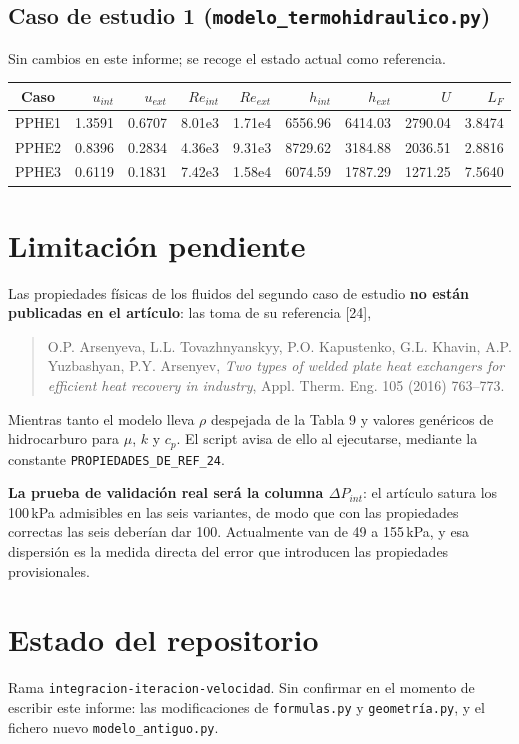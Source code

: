 \documentclass[11pt,a4paper]{article}
\begin{document}
\subsection{Caso de estudio 1 (\texttt{modelo\_termohidraulico.py})}

Sin cambios en este informe; se recoge el estado actual como referencia.

\begin{table}[h]
\centering
\begin{tabular}{crrrrrrrr}
\toprule
Caso & $u_{int}$ & $u_{ext}$ & $Re_{int}$ & $Re_{ext}$ & $h_{int}$ & $h_{ext}$ & $U$ & $L_F$\\
\midrule
PPHE1 & 1.3591 & 0.6707 & 8.01e3 & 1.71e4 & 6556.96 & 6414.03 & 2790.04 & 3.8474\\
PPHE2 & 0.8396 & 0.2834 & 4.36e3 & 9.31e3 & 8729.62 & 3184.88 & 2036.51 & 2.8816\\
PPHE3 & 0.6119 & 0.1831 & 7.42e3 & 1.58e4 & 6074.59 & 1787.29 & 1271.25 & 7.5640\\
\bottomrule
\end{tabular}
\end{table}

\section{Limitación pendiente}

Las propiedades físicas de los fluidos del segundo caso de estudio \textbf{no están publicadas
en el artículo}: las toma de su referencia [24],
\begin{quote}
O.P. Arsenyeva, L.L. Tovazhnyanskyy, P.O. Kapustenko, G.L. Khavin, A.P. Yuzbashyan,
P.Y. Arsenyev, \emph{Two types of welded plate heat exchangers for efficient heat recovery in
industry}, Appl. Therm. Eng. 105 (2016) 763--773.
\end{quote}

Mientras tanto el modelo lleva $\rho$ despejada de la Tabla 9 y valores genéricos de
hidrocarburo para $\mu$, $k$ y $c_p$. El script avisa de ello al ejecutarse, mediante la
constante \texttt{PROPIEDADES\_DE\_REF\_24}.

\textbf{La prueba de validación real será la columna $\Delta P_{int}$}: el artículo satura los
100\,kPa admisibles en las seis variantes, de modo que con las propiedades correctas las seis
deberían dar 100. Actualmente van de 49 a 155\,kPa, y esa dispersión es la medida directa del
error que introducen las propiedades provisionales.

\section{Estado del repositorio}

Rama \texttt{integracion-iteracion-velocidad}. Sin confirmar en el momento de escribir este
informe: las modificaciones de \texttt{formulas.py} y \texttt{geometría.py}, y el fichero nuevo
\texttt{modelo\_antiguo.py}.
\end{document}
